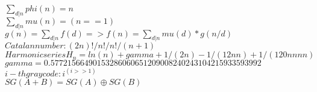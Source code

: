 $\sum_{d|n} phi(n) = n$\\
$\sum_{d|n} mu(n) = (n==1)$\\
$g(n) = \sum_{d|n} f(d) => f(n) = \sum_{d|n} mu(d)*g(n/d)$\\
$Catalan number: (2n)!/n!/n!/(n+1)$\\
$Harmonic series H_n = ln(n) + gamma + 1/(2n) - 1/(12nn) + 1/(120nnnn)$\\
$gamma = 0.57721566490153286060651209008240243104215933593992$\\
$i-th gray code:i^{(i>>1)}$\\
$SG(A+B)=SG(A)\oplus SG(B)$